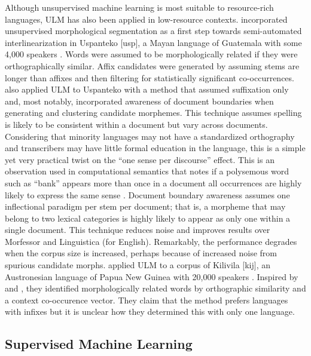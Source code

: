 \documentclass[12pt]{article}
\begin{document}
Although unsupervised machine learning is most suitable to resource-rich languages, ULM has also been applied in low-resource contexts.  incorporated unsupervised morphological segmentation as a first step towards semi-automated interlinearization in Uspanteko [usp], a Mayan language of Guatemala with some 4,000 speakers \cite{simons_ethnologue:_2018}. Words were assumed to be morphologically related if they were orthographically similar. Affix candidates were generated by assuming stems are longer than affixes and then filtering for statistically significant co-occurrences.  also applied ULM to Uspanteko with a method that assumed suffixation only and, most notably, incorporated awareness of document boundaries when generating and clustering candidate morphemes. This technique assumes spelling is likely to be consistent within a document but vary across documents. Considering that minority languages may not have a standardized orthography and transcribers may have little formal education in the language, this is a simple yet very practical twist on the “one sense per discourse” effect. This is an observation used in computational semantics that notes if a polysemous word such as ``bank'' appears more than once in a document all occurrences are highly likely to express the same sense \cite{gale_one_1992}. Document boundary awareness assumes one inflectional paradigm per stem per document; that is, a morpheme that may belong to two lexical categories is highly likely to appear as only one within a single document. This technique reduces noise and improves results over Morfessor and Linguistica (for English). Remarkably, the performance degrades when the corpus size is increased, perhaps because of increased noise from spurious candidate morphs.  applied ULM to a corpus of Kilivila [kij], an Austronesian language of Papua New Guinea with 20,000 speakers \cite{simons_ethnologue:_2018}. Inspired by  and , they identified morphologically related words by orthographic similarity and a context co-occurence vector. They claim that the method prefers languages with infixes but it is unclear how they determined this with only one language. 

\subsection{Supervised Machine Learning}
\label{sec:supervised}
\end{document}
